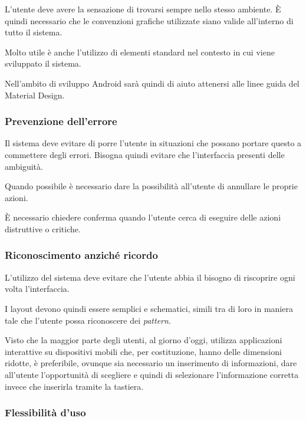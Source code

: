 L'utente deve avere la sensazione di trovarsi sempre nello stesso ambiente. È quindi necessario che le convenzioni grafiche utilizzate siano valide all'interno di tutto il sistema.

Molto utile è anche l'utilizzo di elementi standard nel contesto in cui viene sviluppato il sistema.

Nell'ambito di sviluppo Android sarà quindi di aiuto attenersi alle linee guida del Material Design.

\hypertarget{prevenzione-dellerrore}{%
\subsubsection{Prevenzione dell'errore}\label{prevenzione-dellerrore}}

Il sistema deve evitare di porre l'utente in situazioni che possano portare questo a commettere degli errori. Bisogna quindi evitare che l'interfaccia presenti delle ambiguità.

Quando possibile è necessario dare la possibilità all'utente di annullare le proprie azioni.

È necessario chiedere conferma quando l'utente cerca di eseguire delle azioni distruttive o critiche.

\hypertarget{riconoscimento-anzichuxe9-ricordo}{%
\subsubsection{Riconoscimento anziché ricordo}\label{riconoscimento-anzichuxe9-ricordo}}

L'utilizzo del sistema deve evitare che l'utente abbia il bisogno di riscoprire ogni volta l'interfaccia.

I layout devono quindi essere semplici e schematici, simili tra di loro in maniera tale che l'utente possa riconoscere dei \emph{pattern.}

Visto che la maggior parte degli utenti, al giorno d'oggi, utilizza applicazioni interattive su dispositivi mobili che, per costituzione, hanno delle dimensioni ridotte, è preferibile, ovunque sia necessario un inserimento di informazioni, dare all'utente l'opportunità di scegliere e quindi di selezionare l'informazione corretta invece che inserirla tramite la tastiera.

\hypertarget{flessibilituxe0-duso}{%
\subsubsection{Flessibilità d'uso}\label{flessibilituxe0-duso}}

